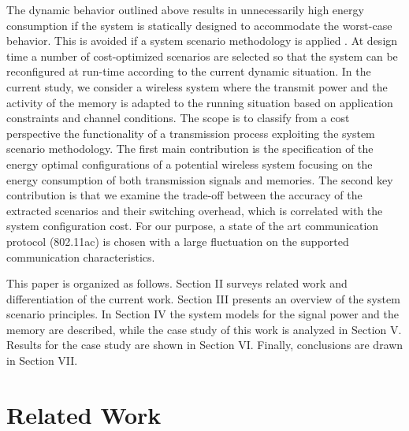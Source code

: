 	The dynamic behavior outlined above results in unnecessarily high energy consumption if the system is statically designed to accommodate the worst-case behavior. This is avoided if a system scenario methodology is applied \cite{17}. At design time a number of cost-optimized scenarios are selected so that the system can be reconfigured at run-time according to the current dynamic situation. In the current study, we consider a wireless system where the transmit power and the activity of the memory is adapted to the running situation based on application constraints and channel conditions. The scope is to classify from a cost perspective the functionality of a transmission process exploiting the system scenario methodology. The first main contribution is the specification of the energy optimal configurations of a potential wireless system focusing on the energy consumption of both transmission signals and memories. The second key contribution is that we examine the trade-off between the accuracy of the extracted scenarios and their switching overhead, which is correlated with the system configuration cost. For our purpose, a state of the art communication protocol (802.11ac) is chosen with a large fluctuation on the supported communication characteristics.

This paper is organized as follows. Section II surveys related work and differentiation of the current work. Section III presents an overview of the system scenario principles. In Section IV the system models for the signal power and the memory are described, while the case study of this work is analyzed in Section V. Results for the case study are shown in Section VI. Finally, conclusions are drawn in Section VII.

\section{Related Work}

